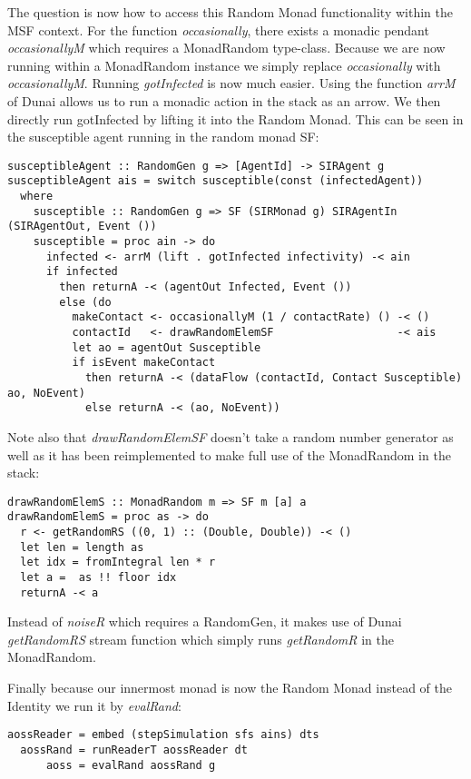 The question is now how to access this Random Monad functionality within the MSF context. For the function \textit{occasionally}, there exists a monadic pendant \textit{occasionallyM} which requires a MonadRandom type-class. Because we are now running within a MonadRandom instance we simply replace \textit{occasionally} with \textit{occasionallyM}. Running \textit{gotInfected} is now much easier. Using the function \textit{arrM} of Dunai allows us to run a monadic action in the stack as an arrow. We then directly run gotInfected by lifting it into the Random Monad.
This can be seen in the susceptible agent running in the random monad SF:
\begin{verbatim}
susceptibleAgent :: RandomGen g => [AgentId] -> SIRAgent g
susceptibleAgent ais = switch susceptible(const (infectedAgent))
  where
    susceptible :: RandomGen g => SF (SIRMonad g) SIRAgentIn (SIRAgentOut, Event ())
    susceptible = proc ain -> do
      infected <- arrM (lift . gotInfected infectivity) -< ain
      if infected 
        then returnA -< (agentOut Infected, Event ())
        else (do
          makeContact <- occasionallyM (1 / contactRate) () -< ()
          contactId   <- drawRandomElemSF                   -< ais
          let ao = agentOut Susceptible
          if isEvent makeContact
            then returnA -< (dataFlow (contactId, Contact Susceptible) ao, NoEvent)
            else returnA -< (ao, NoEvent))
\end{verbatim}

Note also that \textit{drawRandomElemSF} doesn't take a random number generator as well as it has been reimplemented to make full use of the MonadRandom in the stack:

\begin{verbatim}
drawRandomElemS :: MonadRandom m => SF m [a] a
drawRandomElemS = proc as -> do
  r <- getRandomRS ((0, 1) :: (Double, Double)) -< ()
  let len = length as
  let idx = fromIntegral len * r
  let a =  as !! floor idx
  returnA -< a
\end{verbatim}

Instead of \textit{noiseR} which requires a RandomGen, it makes use of Dunai \textit{getRandomRS} stream function which simply runs \textit{getRandomR} in the MonadRandom.

Finally because our innermost monad is now the Random Monad instead of the Identity we run it by \textit{evalRand}:

\begin{verbatim}
aossReader = embed (stepSimulation sfs ains) dts
  aossRand = runReaderT aossReader dt
      aoss = evalRand aossRand g
\end{verbatim}

